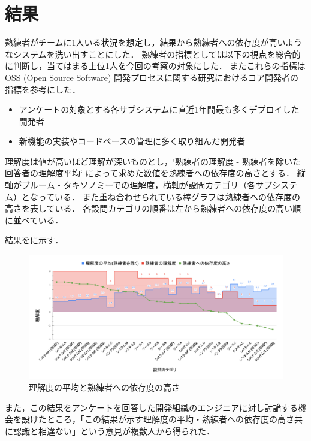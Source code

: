 \section{結果}
熟練者がチームに1人いる状況を想定し，結果から熟練者への依存度が高いようなシステムを洗い出すことにした．
熟練者の指標としては以下の視点を総合的に判断し，当てはまる上位1人を今回の考察の対象にした．
またこれらの指標はOSS (Open Source Software) 開発プロセスに関する研究\cite{bib:mockus}におけるコア開発者の指標を参考にした．

\begin{itemize}
	\item アンケートの対象とする各サブシステムに直近1年間最も多くデプロイした開発者
	\item 新機能の実装やコードベースの管理に多く取り組んだ開発者
\end{itemize}

理解度は値が高いほど理解が深いものとし，`熟練者の理解度 - 熟練者を除いた回答者の理解度平均` によって求めた数値を熟練者への依存度の高さとする．
縦軸がブルーム・タキソノミーでの理解度，横軸が設問カテゴリ（各サブシステム）となっている．
また重ね合わせられている棒グラフは熟練者への依存度の高さを表している．
各設問カテゴリの順番は左から熟練者への依存度の高い順に並べている．

結果をに示す．

\begin{figure}[h]
	\centering
	\includegraphics[keepaspectratio,width=0.9\linewidth]{img/rikai.png}
	\caption{理解度の平均と熟練者への依存度の高さ}
	\label{img:rikai}
\end{figure}

また，この結果をアンケートを回答した開発組織のエンジニアに対し討論する機会を設けたところ，「この結果が示す理解度の平均・熟練者への依存度の高さ共に認識と相違ない」という意見が複数人から得られた．
